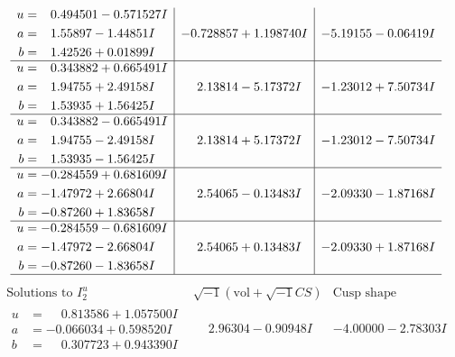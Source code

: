 \documentclass[1p]{elsarticle_modified}
\theoremstyle{definition}
\newcommand{\I}{\sqrt{-1}}
\begin{document}
$$\begin{array}{c|c|c}
\begin{aligned}
u &= \phantom{-}0.494501 - 0.571527 I \\
a &= \phantom{-}1.55897 - 1.44851 I \\
b &= \phantom{-}1.42526 + 0.01899 I\end{aligned}
 & -0.728857 + 1.198740 I & -5.19155 - 0.06419 I \\ \hline\begin{aligned}
u &= \phantom{-}0.343882 + 0.665491 I \\
a &= \phantom{-}1.94755 + 2.49158 I \\
b &= \phantom{-}1.53935 + 1.56425 I\end{aligned}
 & \phantom{-}2.13814 - 5.17372 I & -1.23012 + 7.50734 I \\ \hline\begin{aligned}
u &= \phantom{-}0.343882 - 0.665491 I \\
a &= \phantom{-}1.94755 - 2.49158 I \\
b &= \phantom{-}1.53935 - 1.56425 I\end{aligned}
 & \phantom{-}2.13814 + 5.17372 I & -1.23012 - 7.50734 I \\ \hline\begin{aligned}
u &= -0.284559 + 0.681609 I \\
a &= -1.47972 + 2.66804 I \\
b &= -0.87260 + 1.83658 I\end{aligned}
 & \phantom{-}2.54065 - 0.13483 I & -2.09330 - 1.87168 I \\ \hline\begin{aligned}
u &= -0.284559 - 0.681609 I \\
a &= -1.47972 - 2.66804 I \\
b &= -0.87260 - 1.83658 I\end{aligned}
 & \phantom{-}2.54065 + 0.13483 I & -2.09330 + 1.87168 I\\
 \hline 
 \end{array}$$\newpage$$\begin{array}{c|c|c}  
\text{Solutions to }I^u_{2}& \I (\text{vol} + \sqrt{-1}CS) & \text{Cusp shape}\\
 \hline 
\begin{aligned}
u &= \phantom{-}0.813586 + 1.057500 I \\
a &= -0.066034 + 0.598520 I \\
b &= \phantom{-}0.307723 + 0.943390 I\end{aligned}
 & \phantom{-}2.96304 - 0.90948 I & -4.00000 - 2.78303 I \\ \hline\begin{aligned}

\end{aligned}
\end{array}$$
\end{document}
